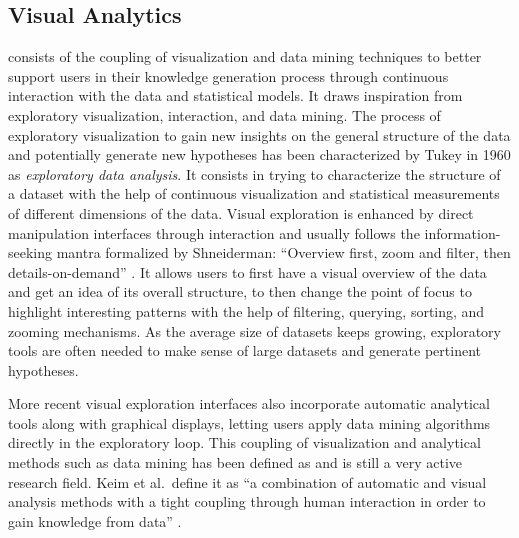 \subsection{Visual Analytics}

\va consists of the coupling of visualization and data mining techniques to better support users in their knowledge generation process through continuous interaction with the data and statistical models\cite{thomasVisualAnalyticsAgenda2006}.
It draws inspiration from exploratory visualization, interaction, and data mining.
The process of exploratory visualization to gain new insights on the general structure of the data and potentially generate new hypotheses has been characterized by Tukey in 1960 as \textit{exploratory data analysis}\cite{tukeyExploratoryDataAnalysis1977}.
It consists in trying to characterize the structure of a dataset with the help of continuous visualization and statistical measurements of different dimensions of the data.
Visual exploration is enhanced by direct manipulation interfaces through interaction and usually follows the information-seeking mantra formalized by Shneiderman: ``Overview first, zoom and filter, then details-on-demand'' \cite{shneidermanEyesHaveIt1996}.
It allows users to first have a visual overview of the data and get an idea of its overall structure, to then change the point of focus to highlight interesting patterns with the help of filtering, querying, sorting, and zooming mechanisms.
As the average size of datasets keeps growing, exploratory tools are often needed to make sense of large datasets and generate pertinent hypotheses.

More recent visual exploration interfaces also incorporate automatic analytical tools along with graphical displays, letting users apply data mining algorithms directly in the exploratory loop.
This coupling of visualization and analytical methods such as data mining has been defined as \va and is still a very active research field.
Keim et al.\ define it as ``a combination of automatic and visual analysis methods with a tight coupling through human interaction in order to gain knowledge from data'' \cite{keimVisualAnalyticsDefinition2008}.

